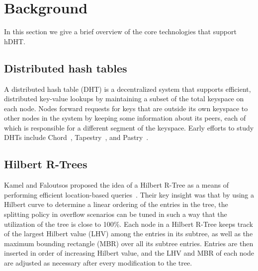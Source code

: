 \section{Background} \label{section:background}
In this section we give a brief overview of the core technologies that support hDHT.

\subsection{Distributed hash tables}
A distributed hash table (DHT) is a decentralized system that supports efficient, distributed key-value lookups by maintaining a subset of the total keyspace on each node. Nodes forward requests for keys that are outside its own keyspace to other nodes in the system by keeping some information about its peers, each of which is responsible for a different segment of the keyspace. Early efforts to study DHTs include Chord~\cite{stoica2001chord}, Tapestry~\cite{zhao2001tapestry}, and Pastry~\cite{rowstron2001pastry}.

\subsection{Hilbert R-Trees}
Kamel and Faloutsos proposed the idea of a Hilbert R-Tree as a means of performing efficient location-based queries~\cite{kamel1993hilbert}. Their key insight was that by using a Hilbert curve to determine a linear ordering of the entries in the tree, the splitting policy in overflow scenarios can be tuned in such a way that the utilization of the tree is close to 100\%. Each node in a Hilbert R-Tree keeps track of the largest Hilbert value (LHV) among the entries in its subtree, as well as the maximum bounding rectangle (MBR) over all its subtree entries. Entries are then inserted in order of increasing Hilbert value, and the LHV and MBR of each node are adjusted as necessary after every modification to the tree.